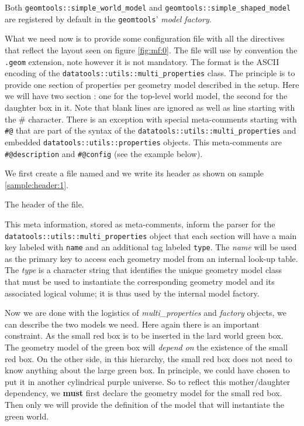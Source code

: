 Both            \texttt{geomtools::simple\_world\_model}           and
\texttt{geomtools::simple\_shaped\_model} are registered by default in
the \texttt{geomtools}' \emph{model factory}.

What we  need now is to  provide some configuration file  with all the
directives that reflect the  layout seen on figure \ref{fig:mf:0}. The
file will use by convention the \texttt{.geom} extension, note however
it  is  not  mandatory.  The  format  is  the  ASCII encoding  of  the
\texttt{datatools::utils::multi\_properties}  class. The  principle is
to provide one  section of properties per geometry  model described in
the setup. Here we will have two section : one for the top-level world
model, the  second for the daughter  box in it. Note  that blank lines
are ignored as  well as line starting with the  \# character. There is
an exception  with special meta-comments starting  with \verb+#@+ that
are        part        of        the       syntax        of        the
\texttt{datatools::utils::multi\_properties}        and       embedded
\texttt{datatools::utils::properties} objects.  This meta-comments are
\verb+#@description+ and \verb+#@config+ (see the example below).

We first  create a file named   and we write
its header as shown on sample \ref{sample:header:1}.

\begin{sample}
\caption{The header of the   file.}
\label{sample:header:1}
\end{sample}


\pn This meta information,  stored as meta-comments, inform the parser
for  the \\  \texttt{datatools::utils::multi\_properties}  object that
each section  will have  a main key  labeled with \verb+name+  and an
additional tag labeled \verb+type+.  The \emph{name} will be used as
the primary key to access  each geometry model from an internal look-up
table.   The \emph{type}  is a  character string  that  identifies the
unique  geometry model  class that  must  be used  to instantiate  the
corresponding geometry model and  its associated logical volume; it is
thus used by the internal model factory.

\pn Now we are done with the logistics of \emph{multi\_properties} and
\emph{factory} objects, we can describe  the two models we need.  Here
again there is an important constraint.  As the small red box is to be
inserted in the lard world green  box. The geometry model of the green
box will \emph{depend on} the existence  of the small red box.  On the
other side, in this hierarchy, the small red box does not need to know
anything about the large green box. In principle, we could have chosen
to put it in another  cylindrical purple universe.  So to reflect this
mother/daughter  dependency,   we  \textbf{must}  first   declare  the
geometry model  for the small red  box. Then only we  will provide the
definition of the model that will instantiate the green world.

